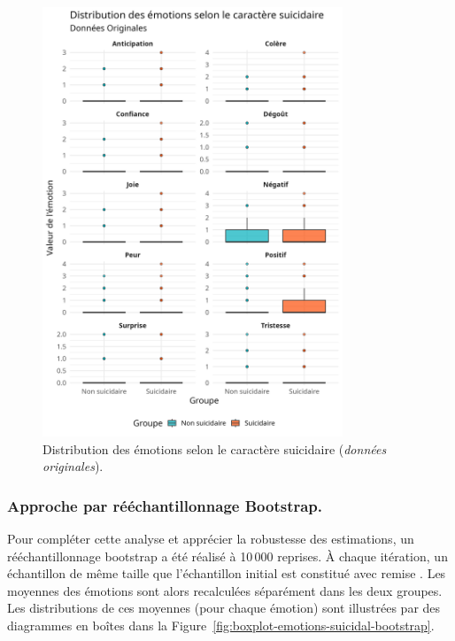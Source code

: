 \begin{figure}[H]
	\centering
	\includegraphics[width=0.8\textwidth]{images/boxplot-emotions-suicidal-raw.png}
	\caption{Distribution des émotions selon le caractère suicidaire (\emph{données originales}).}
	\label{fig:boxplot-emotions-suicidal-raw}
\end{figure}


\subsubsection{Approche par rééchantillonnage Bootstrap.}
Pour compléter cette analyse et apprécier la robustesse des estimations, un rééchantillonnage bootstrap a été réalisé à 10\,000 reprises. À chaque itération, un échantillon de même taille que l’échantillon initial est constitué \og avec remise \fg{}. Les moyennes des émotions sont alors recalculées séparément dans les deux groupes. Les distributions de ces moyennes (pour chaque émotion) sont illustrées par des diagrammes en boîtes dans la Figure~\ref{fig:boxplot-emotions-suicidal-bootstrap}.

